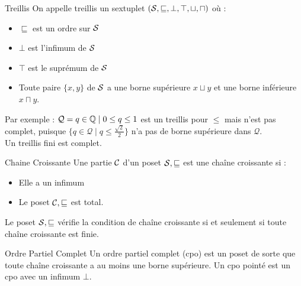 \documentclass{cours}
\begin{document}
\begin{définition}{Treillis}{}
On appelle treillis un sextuplet $\left(\mathcal{S}, \sqsubseteq, \bot, \top,\sqcup, \sqcap\right)$ où :
\begin{itemize}
	\item $\sqsubseteq$ est un ordre sur $\mathcal{S}$
	\item $\bot$ est l'infimum de $\mathcal{S}$
	\item $\top$ est le suprémum de $\mathcal{S}$
	\item Toute paire $\{x, y\}$ de $\mathcal{S}$ a une borne supérieure $x \sqcup y$ et une borne inférieure $x \sqcap y$.
\end{itemize}
\end{définition}

Par exemple : $\mathcal{Q} = {q \in \mathbb{Q} \mid 0 \leq q \leq 1}$ est un treillis pour $\leq$ mais n'est pas complet, puisque $\{q \in \mathcal{Q} \mid q \leq \frac{\sqrt{2}}{2}\}$ n'a pas de borne supérieure dans $\mathcal{Q}$.\\
Un treillis fini est complet.
\begin{définition}{Chaine Croissante}{}
Une partie $\mathcal{C}$ d'un poset $\mathcal{S}, \sqsubseteq$ est une chaîne croissante si :
\begin{itemize}
	\item Elle a un infimum
	\item Le poset $\mathcal{C}, \sqsubseteq$ est total.
\end{itemize}
Le poset $\mathcal{S}, \sqsubseteq$ vérifie la condition de chaîne croissante si et seulement si toute chaîne croissante est finie.
\end{définition}

\begin{définition}{Ordre Partiel Complet}{}
Un ordre partiel complet (cpo) est un poset de sorte que toute chaîne croissante a au moins une borne supérieure. Un cpo pointé est un cpo avec un infimum $\bot$.
\end{définition}
\end{document}
